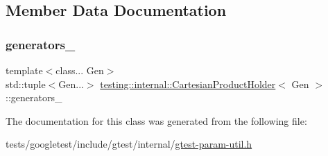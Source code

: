 \subsection{Member Data Documentation}
\mbox{\label{classtesting_1_1internal_1_1CartesianProductHolder_a6efba108d2025dbbce1129506284feaf}} 
\subsubsection{\texorpdfstring{generators\+\_\+}{generators\_}}
{\footnotesize\ttfamily template$<$class... Gen$>$ \\
std\+::tuple$<$Gen...$>$ \hyperlink{classtesting_1_1internal_1_1CartesianProductHolder}{testing\+::internal\+::\+Cartesian\+Product\+Holder}$<$ Gen $>$\+::generators\+\_\+\hspace{0.3cm}{\ttfamily [private]}}



The documentation for this class was generated from the following file\+:\begin{DoxyCompactItemize}
\item 
tests/googletest/include/gtest/internal/\hyperlink{gtest-param-util_8h}{gtest-\/param-\/util.\+h}\end{DoxyCompactItemize}
